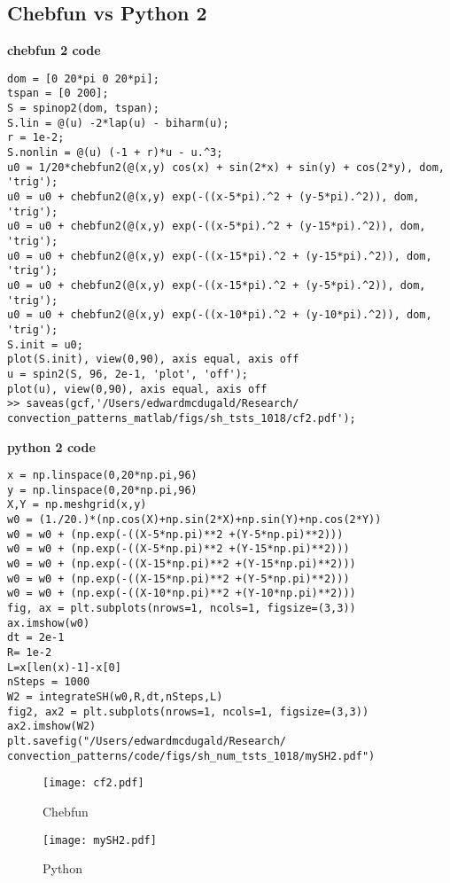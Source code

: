 \documentclass[12pt]{article}
\begin{document}
\subsection{Chebfun vs Python 2}
\textbf{chebfun 2 code}
\begin{verbatim}
dom = [0 20*pi 0 20*pi];
tspan = [0 200];
S = spinop2(dom, tspan);
S.lin = @(u) -2*lap(u) - biharm(u);
r = 1e-2;
S.nonlin = @(u) (-1 + r)*u - u.^3;
u0 = 1/20*chebfun2(@(x,y) cos(x) + sin(2*x) + sin(y) + cos(2*y), dom, 'trig');
u0 = u0 + chebfun2(@(x,y) exp(-((x-5*pi).^2 + (y-5*pi).^2)), dom, 'trig');
u0 = u0 + chebfun2(@(x,y) exp(-((x-5*pi).^2 + (y-15*pi).^2)), dom, 'trig');
u0 = u0 + chebfun2(@(x,y) exp(-((x-15*pi).^2 + (y-15*pi).^2)), dom, 'trig');
u0 = u0 + chebfun2(@(x,y) exp(-((x-15*pi).^2 + (y-5*pi).^2)), dom, 'trig');
u0 = u0 + chebfun2(@(x,y) exp(-((x-10*pi).^2 + (y-10*pi).^2)), dom, 'trig');
S.init = u0;
plot(S.init), view(0,90), axis equal, axis off
u = spin2(S, 96, 2e-1, 'plot', 'off');
plot(u), view(0,90), axis equal, axis off
>> saveas(gcf,'/Users/edwardmcdugald/Research/
convection_patterns_matlab/figs/sh_tsts_1018/cf2.pdf');
\end{verbatim}
\textbf{python 2 code}
\begin{verbatim}
x = np.linspace(0,20*np.pi,96)
y = np.linspace(0,20*np.pi,96)
X,Y = np.meshgrid(x,y)
w0 = (1./20.)*(np.cos(X)+np.sin(2*X)+np.sin(Y)+np.cos(2*Y))
w0 = w0 + (np.exp(-((X-5*np.pi)**2 +(Y-5*np.pi)**2)))
w0 = w0 + (np.exp(-((X-5*np.pi)**2 +(Y-15*np.pi)**2)))
w0 = w0 + (np.exp(-((X-15*np.pi)**2 +(Y-15*np.pi)**2)))
w0 = w0 + (np.exp(-((X-15*np.pi)**2 +(Y-5*np.pi)**2)))
w0 = w0 + (np.exp(-((X-10*np.pi)**2 +(Y-10*np.pi)**2)))
fig, ax = plt.subplots(nrows=1, ncols=1, figsize=(3,3))
ax.imshow(w0)
dt = 2e-1
R= 1e-2
L=x[len(x)-1]-x[0]
nSteps = 1000
W2 = integrateSH(w0,R,dt,nSteps,L)
fig2, ax2 = plt.subplots(nrows=1, ncols=1, figsize=(3,3))
ax2.imshow(W2)
plt.savefig("/Users/edwardmcdugald/Research/
convection_patterns/code/figs/sh_num_tsts_1018/mySH2.pdf")
\end{verbatim}
\begin{figure}
\centering
\parbox{7cm}{
\texttt{[image: cf2.pdf]}
\caption{Chebfun}
\label{fig:2figsA}}
\qquad
\begin{minipage}{7cm}
\texttt{[image: mySH2.pdf]}
\caption{Python}
\label{fig:2figsB}
\end{minipage}
\end{figure}
\end{document}

